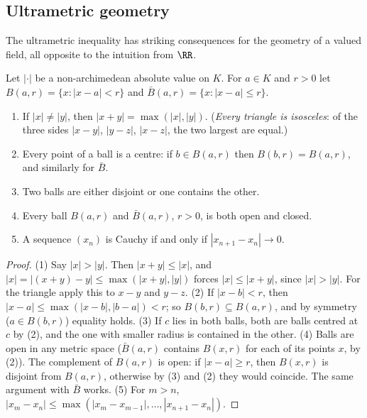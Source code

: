 \subsection{Ultrametric geometry}\label{p-adic-numbers:subsection-ultrametric}

The ultrametric inequality has striking consequences for the geometry of a valued field, all opposite to the intuition from $\RR$.

\begin{proposition}\label{p-adic-numbers:proposition-ultrametric}
Let $|\cdot|$ be a non-archimedean absolute value on $K$. For $a \in K$ and $r > 0$ let $B(a, r) = \{x : |x - a| < r\}$ and $\bar B(a, r) = \{x : |x - a| \leq r\}$.
\begin{enumerate}
\item If $|x| \neq |y|$, then $|x + y| = \max(|x|, |y|)$. (\emph{Every triangle is isosceles}: of the three sides $|x - y|$, $|y - z|$, $|x - z|$, the two largest are equal.)
\item Every point of a ball is a centre: if $b \in B(a, r)$ then $B(b, r) = B(a, r)$, and similarly for $\bar B$.
\item Two balls are either disjoint or one contains the other.
\item Every ball $B(a, r)$ and $\bar B(a, r)$, $r > 0$, is both open and closed.
\item A sequence $(x_n)$ is Cauchy if and only if $|x_{n+1} - x_n| \to 0$.
\end{enumerate}
\end{proposition}

\begin{proof}
(1) Say $|x| > |y|$. Then $|x + y| \leq |x|$, and $|x| = |(x + y) - y| \leq \max(|x + y|, |y|)$ forces $|x| \leq |x + y|$, since $|x| > |y|$. For the triangle apply this to $x - y$ and $y - z$.
(2) If $|x - b| < r$, then $|x - a| \leq \max(|x - b|, |b - a|) < r$; so $B(b, r) \subseteq B(a, r)$, and by symmetry ($a \in B(b, r)$) equality holds.
(3) If $c$ lies in both balls, both are balls centred at $c$ by (2), and the one with smaller radius is contained in the other.
(4) Balls are open in any metric space ($\bar B(a, r)$ contains $B(x, r)$ for each of its points $x$, by (2)). The complement of $B(a, r)$ is open: if $|x - a| \geq r$, then $B(x, r)$ is disjoint
from $B(a, r)$, otherwise by (3) and (2) they would coincide. The same argument with $\bar B$ works.
(5) For $m > n$, $|x_m - x_n| \leq \max(|x_{m} - x_{m-1}|, \ldots, |x_{n+1} - x_n|)$.
\end{proof}

